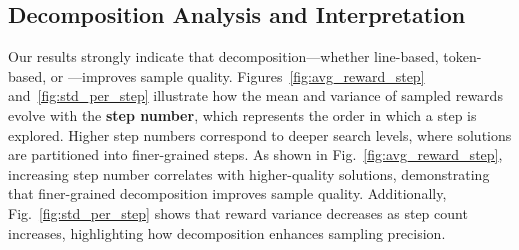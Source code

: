 






\subsection{Decomposition Analysis and Interpretation}

Our results strongly indicate that decomposition—whether line-based, token-based, or \decomp—improves sample quality. 
Figures~\ref{fig:avg_reward_step} and~\ref{fig:std_per_step} illustrate how the mean and variance of sampled rewards evolve with the \textbf{step number}, which represents the order in which a step is explored. Higher step numbers correspond to deeper search levels, where solutions are partitioned into finer-grained steps. As shown in Fig.~\ref{fig:avg_reward_step}, increasing step number correlates with higher-quality solutions, demonstrating that finer-grained decomposition improves sample quality. 
Additionally, Fig.~\ref{fig:std_per_step} shows that reward variance decreases as step count increases, highlighting how decomposition enhances sampling precision.

